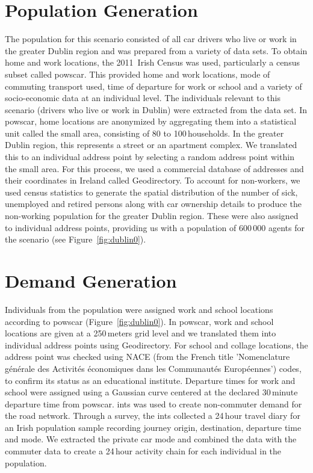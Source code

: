\section{Population Generation}
The population for this scenario consisted of all car drivers who live or work in the greater Dublin region and was prepared from a variety of data sets. To obtain home and work locations, the 2011~Irish Census was used, particularly a census subset called \gls{powscar}. This provided home and work locations, mode of commuting transport used, time of departure for work or school and a variety of socio-economic data at an individual level. The individuals relevant to this scenario (drivers who live or work in Dublin) were extracted from the data set. In \gls{powscar}, home locations are anonymized by aggregating them into a statistical unit called the small area, consisting of 80 to 100\,households.  In the greater Dublin region, this represents a street or an apartment complex. We translated this to an individual address point by selecting a random address point within the small area. For this process, we used a commercial database of addresses and their coordinates in Ireland called Geodirectory. To account for non-workers, we used census statistics to generate the spatial distribution of the number of sick, unemployed and retired persons along with car ownership details to produce the non-working population for the greater Dublin region. These were also assigned to individual address points, providing us with a population of 600\,000 agents for the scenario (see Figure~\ref{fig:dublin0}).

\section{Demand Generation}
Individuals from the population were assigned work and school locations according to \gls{powscar} (Figure~\ref{fig:dublin0}). In \gls{powscar}, work and school locations are given at a 250\,meters grid level and we translated them into individual address points using Geodirectory. For school and collage locations, the address point was checked using NACE (from the French title 'Nomenclature générale des Activités économiques dans les Communautés Européennes') codes, to confirm its status as an educational institute. Departure times for work  and school were assigned using a Gaussian curve centered at the declared 30\,minute departure time from \gls{powscar}. \gls{ints} was used to create non-commuter demand for the road network. Through a survey, the \gls{ints} collected a 24\,hour travel diary for an Irish population sample recording journey origin, destination, departure time and mode. We extracted the private car mode and combined the data with the commuter data to create a 24\,hour activity chain for each individual in the population.

